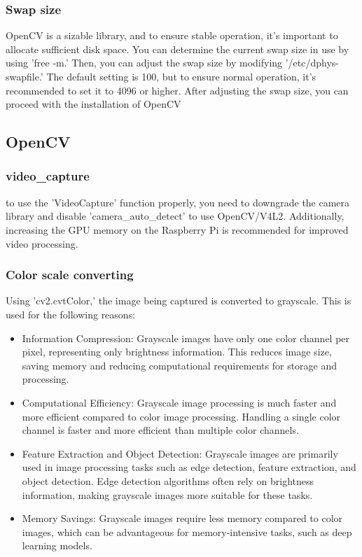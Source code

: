 \subsubsection{\textbf{Swap size}}
OpenCV is a sizable library, and to ensure stable operation, it's important to allocate sufficient disk space. You can determine the current swap size in use by using 'free -m.' Then, you can adjust the swap size by modifying '/etc/dphys-swapfile.' The default setting is 100, but to ensure normal operation, it's recommended to set it to 4096 or higher. After adjusting the swap size, you can proceed with the installation of OpenCV\\

\subsection{\textbf{OpenCV}}
\subsubsection{\textbf{video\_capture}}
 to use the 'VideoCapture' function properly, you need to downgrade the camera library and disable 'camera\_auto\_detect' to use OpenCV/V4L2. Additionally, increasing the GPU memory on the Raspberry Pi is recommended for improved video processing.\\

 \subsubsection{\textbf{Color scale converting}}
Using 'cv2.cvtColor,' the image being captured is converted to grayscale. This is used for the following reasons:\\

\begin{itemize}
\item Information Compression: Grayscale images have only one color channel per pixel, representing only brightness information. This reduces image size, saving memory and reducing computational requirements for storage and processing.\\
\item Computational Efficiency: Grayscale image processing is much faster and more efficient compared to color image processing. Handling a single color channel is faster and more efficient than multiple color channels.\\
\item Feature Extraction and Object Detection: Grayscale images are primarily used in image processing tasks such as edge detection, feature extraction, and object detection. Edge detection algorithms often rely on brightness information, making grayscale images more suitable for these tasks.\\
\item Memory Savings: Grayscale images require less memory compared to color images, which can be advantageous for memory-intensive tasks, such as deep learning models.\\
\end{itemize}

